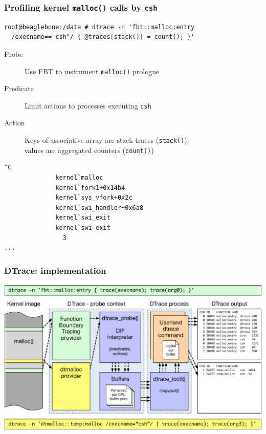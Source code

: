 \begin{frame}[fragile]
  \frametitle{Profiling kernel \texttt{malloc()} calls by \texttt{csh}}

  \begin{small}
\begin{verbatim}
root@beaglebone:/data # dtrace -n 'fbt::malloc:entry
  /execname=="csh"/ { @traces[stack()] = count(); }'
\end{verbatim}
  \end{small}

  \begin{description}
    \item[Probe] Use FBT to instrument \texttt{malloc()} prologue
    \item[Predicate] Limit actions to processes executing \texttt{csh}
    \item[Action] Keys of associative array are stack traces
      (\texttt{stack()}); \\
      values are aggregated counters (\texttt{count()})
  \end{description}

  \pause

  \begin{small}
\begin{verbatim}
^C
              kernel`malloc
              kernel`fork1+0x14b4
              kernel`sys_vfork+0x2c
              kernel`swi_handler+0x6a8
              kernel`swi_exit
              kernel`swi_exit
                3
...
\end{verbatim}
\end{small}
\end{frame}

\begin{frame}
  \frametitle{DTrace: implementation}

  \includegraphics[width=\textwidth]{../../figures/dtrace-the-big-picture.pdf}
\end{frame}

